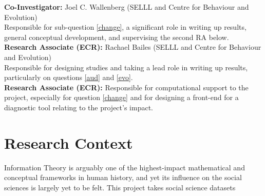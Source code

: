 \documentclass[11pt]{article}
\begin{document}
\noindent\textbf{Co-Investigator:} Joel C. Wallenberg (SELLL and Centre for Behaviour and Evolution)\\
Responsible for sub-question \ref{change}, a significant role in writing up results, general conceptual development, and supervising the second RA below.\\

\noindent\textbf{Research Associate (ECR):} Rachael Bailes (SELLL and Centre for Behaviour and Evolution)\\
Responsible for designing studies and taking a lead role in writing up results, particularly on questions \ref{aud} and \ref{evo}. \\

\noindent\textbf{Research Associate (ECR):} Responsible for computational support to the project, especially for question \ref{change} and for designing a front-end for a diagnostic tool relating to the project's impact.



\section{Research Context}

Information Theory \citep{shannon1948} is arguably one of the highest-impact mathematical and conceptual frameworks in human history, and yet its influence on the social sciences is largely yet to be felt.
This project takes social science datasets
\end{document}
